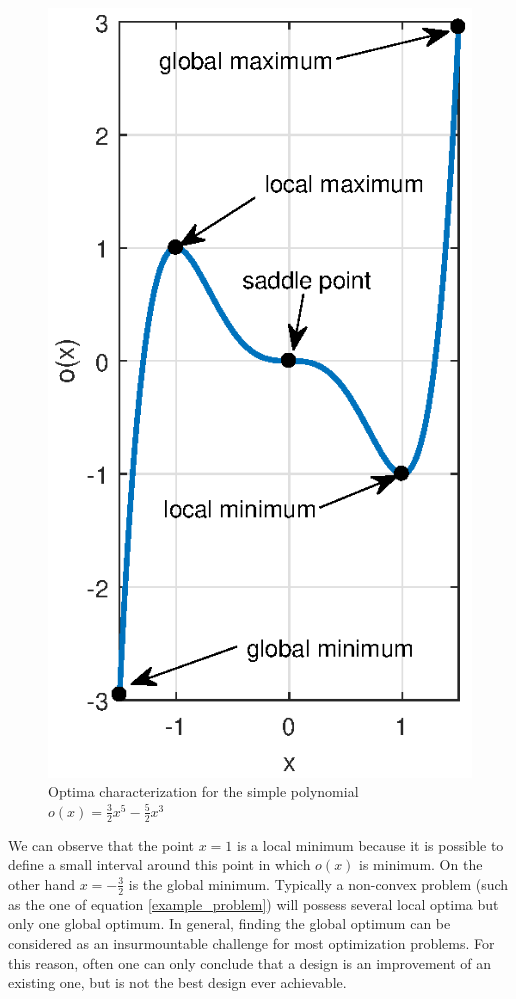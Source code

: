 \begin{figure}[ht]
\centering
\includegraphics[width=12cm]{images/Ch2/example_minimum_maximum}
\caption{Optima characterization for the simple polynomial $o(x)=\frac{3}{2}x^5-\frac{5}{2}x^3$}
\label{fig.2.4b}
\end{figure}
We can observe that the point $x=1$ is a local minimum because it is possible to define a small interval around this point in which $o(x)$ is minimum. On the other hand $x=-\frac{3}{2}$ is the global minimum.
 Typically a non-convex problem (such as the one of equation \ref{example_problem}) will possess several local optima but only one global optimum. In general, finding the global optimum can be considered as an insurmountable challenge for most optimization problems. For this reason, often one can only conclude that a design is an improvement of an existing one, but is not the best design ever achievable. 
